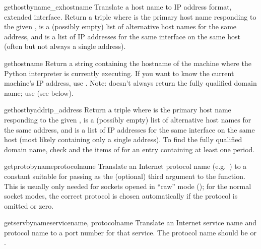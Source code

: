 \begin{funcdesc}{gethostbyname_ex}{hostname}
Translate a host name to IP address format, extended interface.
Return a triple  where
 is the primary host name responding to the given
,  is a (possibly empty) list of
alternative host names for the same address, and  is
a list of IP addresses for the same interface on the same
host (often but not always a single address).
\end{funcdesc}

\begin{funcdesc}{gethostname}{}
Return a string containing the hostname of the machine where 
the Python interpreter is currently executing.  If you want to know the
current machine's IP address, use .
Note:  doesn't always return the fully qualified
domain name; use 
(see below).
\end{funcdesc}

\begin{funcdesc}{gethostbyaddr}{ip_address}
Return a triple  where  is the primary host name
responding to the given ,  is a
(possibly empty) list of alternative host names for the same address,
and  is a list of IP addresses for the same interface
on the same host (most likely containing only a single address).
To find the fully qualified domain name, check  and the
items of  for an entry containing at least one period.
\end{funcdesc}

\begin{funcdesc}{getprotobyname}{protocolname}
Translate an Internet protocol name (e.g.\ ) to a constant
suitable for passing as the (optional) third argument to the
 function.  This is usually only needed for sockets
opened in ``raw'' mode (); for the normal socket
modes, the correct protocol is chosen automatically if the protocol is
omitted or zero.
\end{funcdesc}

\begin{funcdesc}{getservbyname}{servicename, protocolname}
Translate an Internet service name and protocol name to a port number
for that service.  The protocol name should be  or
.
\end{funcdesc}

